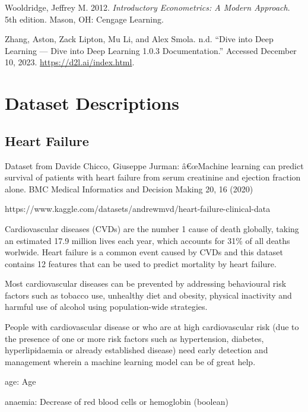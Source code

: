 \documentclass[
  letterpaper,
]{krantz}
\newlength{\cslhangindent}
\newenvironment{CSLReferences}[2] %
 {\begin{list}{}{%
  \setlength{\itemindent}{0pt}
  \setlength{\leftmargin}{0pt}
  \setlength{\parsep}{0pt}
  \ifodd #1
   \setlength{\leftmargin}{\cslhangindent}
   \setlength{\itemindent}{-1\cslhangindent}
  \fi
  \setlength{\itemsep}{#2\baselineskip}}}
 {\end{list}}
\begin{document}
\begin{CSLReferences}{1}{0}
Wooldridge, Jeffrey M. 2012. \emph{Introductory {Econometrics}: {A}
{Modern} {Approach}}. 5th edition. Mason, OH: Cengage Learning.

Zhang, Aston, Zack Lipton, Mu Li, and Alex Smola. n.d. {``Dive into
{Deep} {Learning} --- {Dive} into {Deep} {Learning} 1.0.3
Documentation.''} Accessed December 10, 2023.
\url{https://d2l.ai/index.html}.

\end{CSLReferences}

\chapter{Dataset Descriptions}\label{sec-data-descript}

\section{Heart Failure}\label{sec-dd-hear-failure}

Dataset from Davide Chicco, Giuseppe Jurman: â€œMachine learning can
predict survival of patients with heart failure from serum creatinine
and ejection fraction alone. BMC Medical Informatics and Decision Making
20, 16 (2020)

https://www.kaggle.com/datasets/andrewmvd/heart-failure-clinical-data

Cardiovascular diseases (CVDs) are the number 1 cause of death globally,
taking an estimated 17.9 million lives each year, which accounts for
31\% of all deaths worlwide. Heart failure is a common event caused by
CVDs and this dataset contains 12 features that can be used to predict
mortality by heart failure.

Most cardiovascular diseases can be prevented by addressing behavioural
risk factors such as tobacco use, unhealthy diet and obesity, physical
inactivity and harmful use of alcohol using population-wide strategies.

People with cardiovascular disease or who are at high cardiovascular
risk (due to the presence of one or more risk factors such as
hypertension, diabetes, hyperlipidaemia or already established disease)
need early detection and management wherein a machine learning model can
be of great help.

age: Age

anaemia: Decrease of red blood cells or hemoglobin (boolean)
\end{document}
